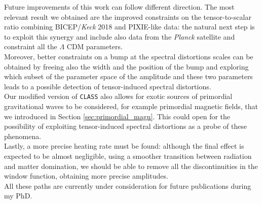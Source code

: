 Future improvements of this work can follow different direction. The most relevant result we obtained are the improved constraints on the tensor-to-scalar ratio combining BICEP/\emph{Keck} 2018 and PIXIE-like data: the natural next step is to exploit this synergy and include also data from the \emph{Planck} satellite and constraint all the $\Lambda$ CDM parameters.\\
Moreover, better constraints on a bump at the spectral distortions scales can be obtained by freeing also the width and the position of the bump and exploring which subset of the parameter space of the amplitude and these two parameters leads to a possible detection of tensor-induced spectral distortions.\\
Our modified version of \texttt{CLASS} also allows for exotic sources of primordial gravitational waves to be considered, for example primordial magnetic fields, that we introduced in Section \ref{sec:primordial_magn}. This could open for the possibility of exploiting tensor-induced spectral distortions as a probe of these phenomena.\\
Lastly, a more precise heating rate must be found: although the final effect is expected to be almost negligible, using a smoother transition between radiation and matter domination, we should be able to remove all the discontinuities in the window function, obtaining more precise amplitudes.\\
All these paths are currently under consideration for future publications during my PhD. 



